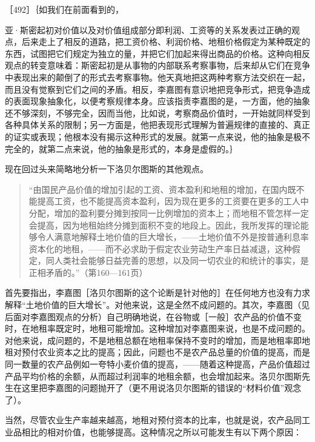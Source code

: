 
［492］｛如我们在前面看到的，

亚·斯密起初对价值以及对价值组成部分即利润、工资等的关系发表过正确的观点，后来走上了相反的道路，把工资价格、利润价格、地租价格假定为某种既定的东西，试图把它们规定为独立的量，并把它们加起来得出商品的价格。这种向相反观点的转变意味着：斯密起初是从事物的内部联系考察事物，后来却从它们在竞争中表现出来的颠倒了的形式去考察事物。他天真地把这两种考察方法交织在一起，而且没有觉察到它们之间的矛盾。相反，李嘉图有意识地把竞争形式，把竞争造成的表面现象抽象化，以便考察规律本身。应该指责李嘉图的是，一方面，他的抽象还不够深刻，不够完全，因而当他，比如说，考察商品价值时，一开始就同样受到各种具体关系的限制；另一方面是，他把表现形式理解为普遍规律的直接的、真正的证实或表现；他根本没有揭示这种形式的发展。就第一点来说，他的抽象是极不完全的，就第二点来说，他的抽象是形式的，本身是虚假的。｝


现在回过头来简略地分析一下洛贝尔图斯的其他观点。

\begin{quote}{“由国民产品价值的增加引起的工资、资本盈利和地租的增加，在国内既不能提高工资，也不能提高资本盈利，因为现在更多的工资要在更多的工人中分配，增加的盈利要分摊到按同一比例增加的资本上；而地租不管怎样一定会提高，因为地租始终分摊到面积不变的地段上。因此，我所发挥的理论能够令人满意地解释土地价值的巨大增长，——土地价值不外是按普通利息率资本化的地租，——而不必求助于假定农业劳动生产率日益减退，这种假定，同人类社会能够日益完善的思想，以及同一切农业的和统计的事实，是正相矛盾的。”（第160—161页）}\end{quote}

首先要指出，李嘉图［洛贝尔图斯的这个论断是针对他的］在任何地方也没有力求解释“土地价值的巨大增长”。对他来说，这是全然不成问题的。其次，李嘉图（见后面对李嘉图观点的分析）自己明确地说，在谷物或［一般］农产品的价值不变时，在地租率既定时，地租可能增加。这种增加对李嘉图来说，也是不成问题的。对他来说，成问题的，不是地租总额在地租率保持不变时的增加，而是地租率即地租对预付农业资本之比的提高；因此，问题也不是农产品总量的价值的提高，而是同一数量的农产品例如一夸特小麦价值的提高，——随着这种提高，产品价值超过产品平均价格的余额，从而超过利润率的地租余额，也会增加起来。洛贝尔图斯先生在这里把李嘉图的问题抛开了（更不用说洛贝尔图斯的错误的“材料价值”观念了）。

当然，尽管农业生产率越来越高，地租对预付资本的比率，也就是说，农产品同工业品相比的相对价值，也能够提高。这种情况之所以可能发生有以下两个原因：

